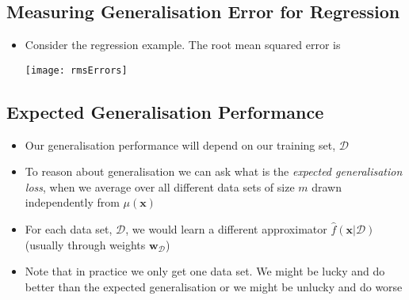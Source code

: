 
\begin{slide}
\section[-1]{Measuring Generalisation Error for Regression}

\begin{PauseHighLight}

\begin{itemize}
\item Consider the regression example.  The root mean squared error
  is
  \begin{center}
    \noindent\texttt{[image: rmsErrors]}
  \end{center}\pause
\end{itemize}

\end{PauseHighLight}
\end{slide}

\Outline %

\begin{slide}
\section{Expected Generalisation Performance}

\begin{PauseHighLight}
  \begin{itemize}
  \item Our generalisation performance will depend on our training set,
    $\mathcal{D}$\pause
  \item To reason about generalisation we can ask what is the
    \textit{expected generalisation loss}, when we average over
    all different data sets of size $m$ drawn independently from
    $\mu(\bm{x})$\pause
  \item For each data set, $\mathcal{D}$, we would learn a different
    approximator $\hat{f}(\bm{x}\vert \mathcal{D})$ (usually through
    weights $\bm{w}_{\mathcal{D}}$)\pause
  \item Note that in practice we only get one data set.  We might be
    lucky and do better than the expected generalisation or we might be
    unlucky and do worse\pause
  \end{itemize}
\end{PauseHighLight}

\end{slide}

